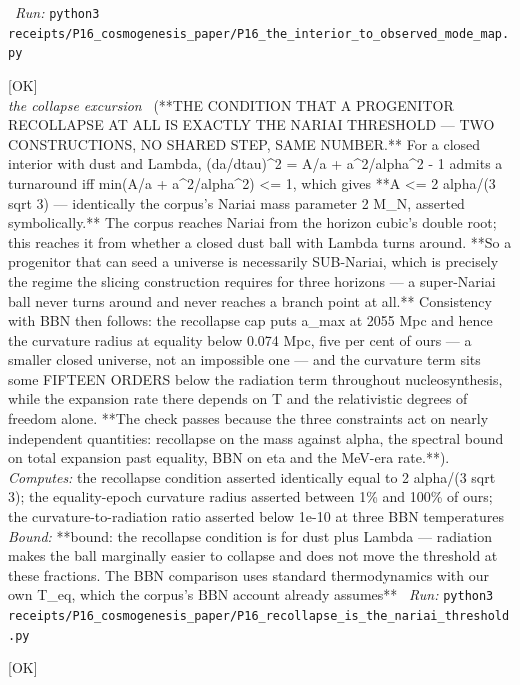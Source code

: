 \begin{description}
\ \emph{Run:} \texttt{python3 receipts/P16\_cosmogenesis\_paper/P16\_the\_interior\_to\_observed\_mode\_map.py}
\item[\label{rcpt:P16_recollapse_is_the_nariai_threshold}\texttt{P16\_recollapse\_is\_the\_nariai\_threshold}]\hfill\textsf{[OK]}\\
\textit{the collapse excursion} \ (**THE CONDITION THAT A PROGENITOR RECOLLAPSE AT ALL IS EXACTLY THE NARIAI THRESHOLD --- TWO CONSTRUCTIONS, NO SHARED STEP, SAME NUMBER.** For a closed interior with dust and Lambda, (da/dtau)\textasciicircum{}2 = A/a + a\textasciicircum{}2/alpha\textasciicircum{}2 - 1 admits a turnaround iff min(A/a + a\textasciicircum{}2/alpha\textasciicircum{}2) <= 1, which gives **A <= 2 alpha/(3 sqrt 3) --- identically the corpus's Nariai mass parameter 2 M\_N, asserted symbolically.** The corpus reaches Nariai from the horizon cubic's double root; this reaches it from whether a closed dust ball with Lambda turns around. **So a progenitor that can seed a universe is necessarily SUB-Nariai, which is precisely the regime the slicing construction requires for three horizons --- a super-Nariai ball never turns around and never reaches a branch point at all.** Consistency with BBN then follows: the recollapse cap puts a\_max at 2055 Mpc and hence the curvature radius at equality below 0.074 Mpc, five per cent of ours --- a smaller closed universe, not an impossible one --- and the curvature term sits some FIFTEEN ORDERS below the radiation term throughout nucleosynthesis, while the expansion rate there depends on T and the relativistic degrees of freedom alone. **The check passes because the three constraints act on nearly independent quantities: recollapse on the mass against alpha, the spectral bound on total expansion past equality, BBN on eta and the MeV-era rate.**). 
\emph{Computes:} the recollapse condition asserted identically equal to 2 alpha/(3 sqrt 3); the equality-epoch curvature radius asserted between 1\% and 100\% of ours; the curvature-to-radiation ratio asserted below 1e-10 at three BBN temperatures
 \emph{Bound:} **bound: the recollapse condition is for dust plus Lambda --- radiation makes the ball marginally easier to collapse and does not move the threshold at these fractions. The BBN comparison uses standard thermodynamics with our own T\_eq, which the corpus's BBN account already assumes**
\ \emph{Run:} \texttt{python3 receipts/P16\_cosmogenesis\_paper/P16\_recollapse\_is\_the\_nariai\_threshold.py}
\item[\label{rcpt:D1_hinge_duality}\texttt{D1\_hinge\_duality}]\hfill\textsf{[OK]}\\

\end{description}
